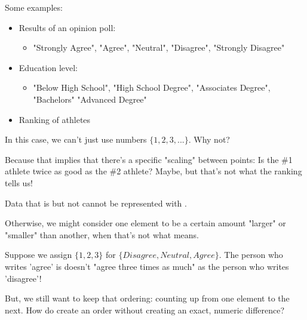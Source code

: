                 Some examples:

                \begin{itemize}
                    \item Results of an opinion poll:
                        \begin{itemize}
                            \item "Strongly Agree", "Agree", "Neutral", "Disagree", "Strongly Disagree"
                        \end{itemize}
                    
                    \item Education level: 
                        \begin{itemize}
                            \item "Below High School", "High School Degree", "Associates Degree", "Bachelors" "Advanced Degree"
                        \end{itemize}
                    
                    \item Ranking of athletes
                \end{itemize}

                In this case, we can't just use numbers $\{1,2,3,...\}$. Why not?

                Because that implies that there's a specific "scaling" between points: Is the \#1 athlete twice as good as the \#2 athlete? Maybe, but that's not what the ranking tells us!\\

                \begin{concept}
                    Data that is  but not  cannot be represented with .

                    Otherwise, we might consider one element to be a certain amount "larger" or "smaller" than another, when that's not what  means.
                \end{concept}

                \miniex Suppose we assign $\{1,2,3\}$ for $\{Disagree, Neutral, Agree\}$. The person who writes 'agree' is doesn't "agree three times as much" as the person who writes 'disagree'!

                But, we still want to keep that ordering: counting up from one element to the next. How do create an order without creating an exact, numeric difference?

